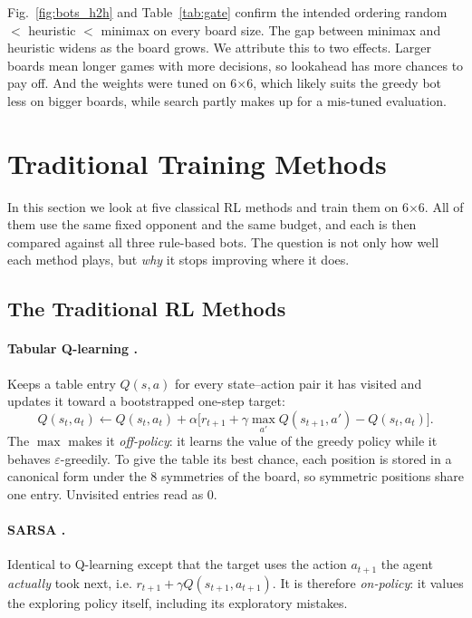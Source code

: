 \documentclass[11pt]{article}
\newcommand{\bx}[1]{#1$\times$#1}
\begin{document}
Fig.~\ref{fig:bots_h2h} and Table~\ref{tab:gate} confirm the intended ordering
random $<$ heuristic $<$ minimax on every board size. The gap between minimax
and heuristic widens as the board grows. We attribute this to two effects.
Larger boards mean longer games with more decisions, so lookahead has more
chances to pay off. And the weights were tuned on \bx{6}, which likely suits the
greedy bot less on bigger boards, while search partly makes up for a mis-tuned
evaluation.

\section{Traditional Training Methods}
\label{sec:classical}

In this section we look at five classical RL methods and train them on \bx{6}. All of them use the
same fixed opponent and the same budget, and each is then compared against all
three rule-based bots. The question is not only how well each method plays, but
\emph{why} it stops improving where it does.

\subsection{The Traditional RL Methods}
\label{sec:classical_methods}

\paragraph{Tabular Q-learning \cite{watkins1992}.} Keeps a table entry $Q(s,a)$
for every state--action pair it has visited and updates it toward a bootstrapped
one-step target:
\[
  Q(s_t,a_t) \leftarrow Q(s_t,a_t) + \alpha\big[r_{t+1} + \gamma \max_{a'} Q(s_{t+1},a') - Q(s_t,a_t)\big].
\]
The $\max$ makes it \emph{off-policy}: it learns the value of the greedy policy
while it behaves $\varepsilon$-greedily. To give the table its best chance, each
position is stored in a canonical form under the 8 symmetries of the board, so
symmetric positions share one entry. Unvisited entries read as 0.

\paragraph{SARSA \cite{rummery1994}.} Identical to Q-learning except that the
target uses the action $a_{t+1}$ the agent \emph{actually} took next, i.e.
$r_{t+1} + \gamma Q(s_{t+1},a_{t+1})$. It is therefore \emph{on-policy}: it values
the exploring policy itself, including its exploratory mistakes.
\end{document}
